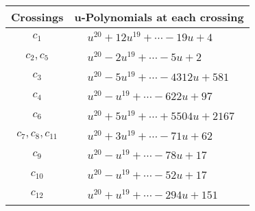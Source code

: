 \documentclass[1p]{elsarticle_modified}
\theoremstyle{definition}
\begin{document}
\begin{tabular}{m{50pt}|m{274pt}}
Crossings & \hspace{64pt}u-Polynomials at each crossing \\
\hline $$\begin{aligned}c_{1}\end{aligned}$$&$\begin{aligned}
&u^{20}+12 u^{19}+\cdots-19 u+4
\end{aligned}$\\
\hline $$\begin{aligned}c_{2},c_{5}\end{aligned}$$&$\begin{aligned}
&u^{20}-2 u^{19}+\cdots-5 u+2
\end{aligned}$\\
\hline $$\begin{aligned}c_{3}\end{aligned}$$&$\begin{aligned}
&u^{20}-5 u^{19}+\cdots-4312 u+581
\end{aligned}$\\
\hline $$\begin{aligned}c_{4}\end{aligned}$$&$\begin{aligned}
&u^{20}- u^{19}+\cdots-622 u+97
\end{aligned}$\\
\hline $$\begin{aligned}c_{6}\end{aligned}$$&$\begin{aligned}
&u^{20}+5 u^{19}+\cdots+5504 u+2167
\end{aligned}$\\
\hline $$\begin{aligned}c_{7},c_{8},c_{11}\end{aligned}$$&$\begin{aligned}
&u^{20}+3 u^{19}+\cdots-71 u+62
\end{aligned}$\\
\hline $$\begin{aligned}c_{9}\end{aligned}$$&$\begin{aligned}
&u^{20}- u^{19}+\cdots-78 u+17
\end{aligned}$\\
\hline $$\begin{aligned}c_{10}\end{aligned}$$&$\begin{aligned}
&u^{20}- u^{19}+\cdots-52 u+17
\end{aligned}$\\
\hline $$\begin{aligned}c_{12}\end{aligned}$$&$\begin{aligned}
&u^{20}+u^{19}+\cdots-294 u+151
\end{aligned}$\\
\hline
\end{tabular}\\~\\
\end{document}
